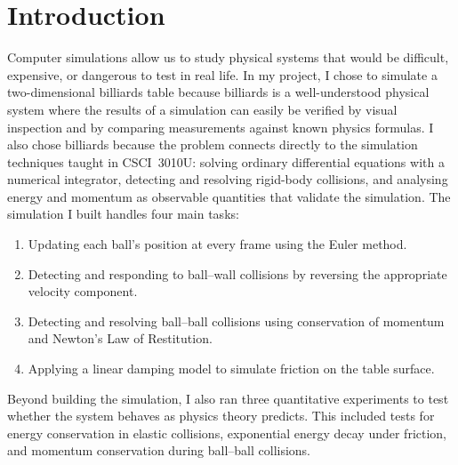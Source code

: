 \documentclass[12pt, letterpaper]{article}
\begin{document}
\section{Introduction}
Computer simulations allow us to study physical systems that would be
difficult, expensive, or dangerous to test in real life.
In my project, I chose to simulate a two-dimensional billiards table
because billiards is a well-understood physical system where the results
of a simulation can easily be verified by visual inspection and by
comparing measurements against known physics formulas.
I also chose billiards because the problem connects directly to the
simulation techniques taught in CSCI~3010U: solving ordinary
differential equations with a numerical integrator, detecting and
resolving rigid-body collisions, and analysing energy and momentum
as observable quantities that validate the simulation.
The simulation I built handles four main tasks:
\begin{enumerate}[noitemsep]
  \item Updating each ball's position at every frame using the Euler
        method.
  \item Detecting and responding to ball--wall collisions by reversing
        the appropriate velocity component.
  \item Detecting and resolving ball--ball collisions using conservation
        of momentum and Newton's Law of Restitution.
  \item Applying a linear damping model to simulate friction on the
        table surface.
\end{enumerate}
Beyond building the simulation, I also ran three quantitative experiments
to test whether the system behaves as physics theory predicts.
This included tests for energy conservation in elastic collisions,
exponential energy decay under friction, and momentum conservation
during ball--ball collisions.
\end{document}
